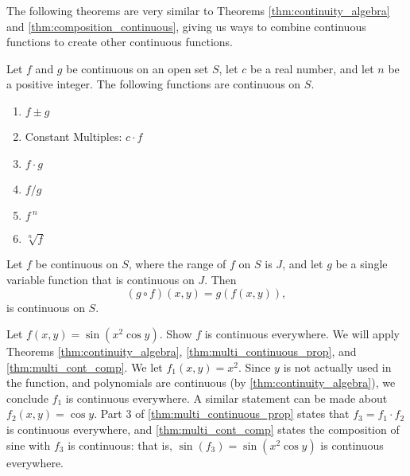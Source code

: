 The following theorems are very similar to Theorems \ref{thm:continuity_algebra} and \ref{thm:composition_continuous}, giving us ways to combine continuous functions to create other continuous functions.

\begin{theorem}\label{thm:multi_continuous_prop}%
Let $f$ and $g$ be continuous on an open set $S$, let $c$ be a real number, and let $n$ be a positive integer. The following functions are continuous on $S$.%
%
\begin{enumerate}
\settowidth{\widest}{Constant Multiples:}
	\item {} $f\pm g$
	\item Constant Multiples: $c\cdot f$
	\item {} $f\cdot g$
	\item {} $f/g$ 
	\item {} $f\,^n$
	\item {} $\sqrt[n]{f}$ 
\end{enumerate}
\end{theorem}

\begin{theorem}\label{thm:multi_cont_comp}%
Let $f$ be continuous on $S$, where the range of $f$ on $S$ is $J$, and let $g$ be a single variable function that is continuous on $J$. Then
\[(g\circ f)(x,y)=g(f(x,y)),\]
is continuous on $S$.
\end{theorem}

\begin{example}\label{ex_multicont2}%
Let $f(x,y) = \sin (x^2\cos y)$. Show $f$ is continuous everywhere.
\solution
We will apply Theorems \ref{thm:continuity_algebra}, \ref{thm:multi_continuous_prop}, and \ref{thm:multi_cont_comp}. We let $f_1(x,y) = x^2$. Since $y$ is not actually used in the function, and polynomials are continuous (by \autoref{thm:continuity_algebra}), we conclude $f_1$ is continuous everywhere. A similar statement can be made about $f_2(x,y) = \cos y$. Part 3 of \autoref{thm:multi_continuous_prop} states that $f_3=f_1\cdot f_2$ is continuous everywhere, and \autoref{thm:multi_cont_comp} states the composition of sine with $f_3$ is continuous: that is, $\sin (f_3) = \sin(x^2\cos y)$ is continuous everywhere.
\end{example}

